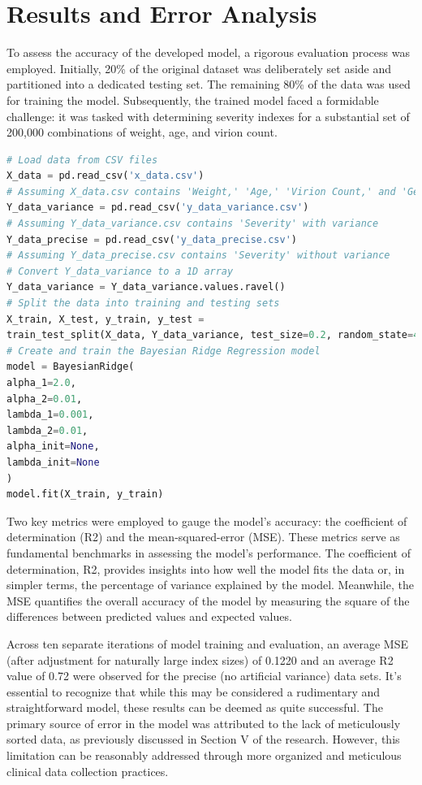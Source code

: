 \documentclass{article}
\begin{document}
\section{Results and Error Analysis}
To assess the accuracy of the developed model, a rigorous evaluation process was
employed. Initially, 20\% of the original dataset was deliberately set aside and partitioned
into a dedicated testing set. The remaining 80\% of the data was used for training the
model. Subsequently, the trained model faced a formidable challenge: it was tasked with
determining severity indexes for a substantial set of 200,000 combinations of weight, age,
and virion count.

\begin{lstlisting}[language=Python, caption={Model creation}, label={lst:python}]
# Load data from CSV files
X_data = pd.read_csv('x_data.csv')
# Assuming X_data.csv contains 'Weight,' 'Age,' 'Virion Count,' and 'Gender'
Y_data_variance = pd.read_csv('y_data_variance.csv')
# Assuming Y_data_variance.csv contains 'Severity' with variance
Y_data_precise = pd.read_csv('y_data_precise.csv')
# Assuming Y_data_precise.csv contains 'Severity' without variance
# Convert Y_data_variance to a 1D array
Y_data_variance = Y_data_variance.values.ravel()
# Split the data into training and testing sets
X_train, X_test, y_train, y_test = 
train_test_split(X_data, Y_data_variance, test_size=0.2, random_state=42)
# Create and train the Bayesian Ridge Regression model
model = BayesianRidge(
alpha_1=2.0,
alpha_2=0.01,
lambda_1=0.001,
lambda_2=0.01,
alpha_init=None,
lambda_init=None
)
model.fit(X_train, y_train)
\end{lstlisting}

Two key metrics were employed to gauge the model's accuracy: the coefficient of
determination (R2) and the mean-squared-error (MSE). These metrics serve as
fundamental benchmarks in assessing the model's performance. The coefficient of
determination, R2, provides insights into how well the model fits the data or, in simpler terms, the percentage of variance explained by the model. Meanwhile, the MSE
quantifies the overall accuracy of the model by measuring the square of the differences
between predicted values and expected values.

Across ten separate iterations of model training and evaluation, an average MSE
(after adjustment for naturally large index sizes) of 0.1220 and an average R2 value of
0.72 were observed for the precise (no artificial variance) data sets. It's essential to
recognize that while this may be considered a rudimentary and straightforward model,
these results can be deemed as quite successful. The primary source of error in the model
was attributed to the lack of meticulously sorted data, as previously discussed in Section
V of the research. However, this limitation can be reasonably addressed through more
organized and meticulous clinical data collection practices.
\end{document}
